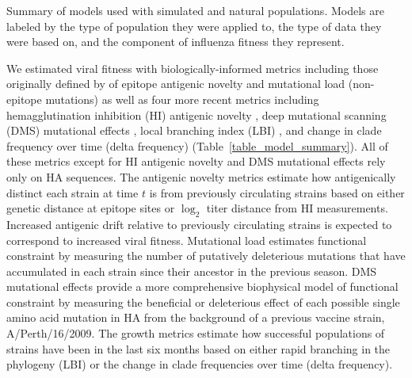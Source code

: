 \begin{table}
  \begin{center}
    \scalebox{0.7}{
      
    }
    \caption{
      Summary of models used with simulated and natural populations.
      Models are labeled by the type of population they were applied to, the type of data they were based on, and the component of influenza fitness they represent.
    }
    \label{table_model_summary}
  \end{center}
\end{table}

We estimated viral fitness with biologically-informed metrics including those originally defined by \cite{Luksza:2014hj} of epitope antigenic novelty and mutational load (non-epitope mutations) as well as four more recent metrics including hemagglutination inhibition (HI) antigenic novelty \citep{Neher:2016hy}, deep mutational scanning (DMS) mutational effects \citep{Lee2018}, local branching index (LBI) \citep{Neher:2014eu}, and change in clade frequency over time (delta frequency) (Table~\ref{table_model_summary}).
All of these metrics except for HI antigenic novelty and DMS mutational effects rely only on HA sequences.
The antigenic novelty metrics estimate how antigenically distinct each strain at time $t$ is from previously circulating strains based on either genetic distance at epitope sites or $\log_{2}$ titer distance from HI measurements.
Increased antigenic drift relative to previously circulating strains is expected to correspond to increased viral fitness.
Mutational load estimates functional constraint by measuring the number of putatively deleterious mutations that have accumulated in each strain since their ancestor in the previous season.
DMS mutational effects provide a more comprehensive biophysical model of functional constraint by measuring the beneficial or deleterious effect of each possible single amino acid mutation in HA from the background of a previous vaccine strain, A/Perth/16/2009.
The growth metrics estimate how successful populations of strains have been in the last six months based on either rapid branching in the phylogeny (LBI) or the change in clade frequencies over time (delta frequency).

